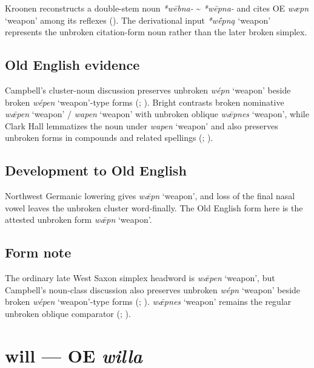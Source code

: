 \documentclass[
  british,
  a4paper,
  openany]{book}
\providecommand{\Recon}[1]{\emph{*#1}}
{\catcode`→=\active \global\def→{\ensuremath{\rightarrow}}}
\providecommand{\texorpdfstring}[2]{#1}
\providecommand{\Recon}[1]{\emph{*#1}}
{\catcode`→=\active \global\def→{\ensuremath{\rightarrow}}}
\begin{document}
Kroonen reconstructs a double-stem noun \emph{*wēbna-} \textasciitilde{}
\emph{*wēpna-} and cites OE \emph{wæpn} `weapon' among its reflexes
(). The derivational input
\Recon{wḗpną} `weapon' represents the unbroken citation-form noun rather
than the later broken simplex.

\subsection{Old English evidence}\label{old-english-evidence-65}

Campbell's cluster-noun discussion preserves unbroken \emph{wépn}
`weapon' beside broken \emph{wépen} `weapon'-type forms
(;
). Bright contrasts broken
nominative \emph{wǣpen} `weapon' / \emph{wapen} `weapon' with unbroken
oblique \emph{wǣpnes} `weapon', while Clark Hall lemmatizes the noun
under \emph{wapen} `weapon' and also preserves unbroken forms in
compounds and related spellings
(;
).

\subsection{Development to Old
English}\label{development-to-old-english-65}

Northwest Germanic lowering gives \emph{wǣpn} `weapon', and loss of the
final nasal vowel leaves the unbroken cluster word-finally. The Old
English form here is the attested unbroken form \emph{wǣpn} `weapon'.

\subsection{Form note}\label{form-note-26}

The ordinary late West Saxon simplex headword is \emph{wǣpen} `weapon',
but Campbell's noun-class discussion also preserves unbroken \emph{wépn}
`weapon' beside broken \emph{wépen} `weapon'-type forms
(;
). \emph{wǣpnes} `weapon'
remains the regular unbroken oblique comparator
(;
).

\section{\texorpdfstring{will --- OE
\emph{willa}}{will --- OE willa}}\label{will-oe-willa}
\end{document}
